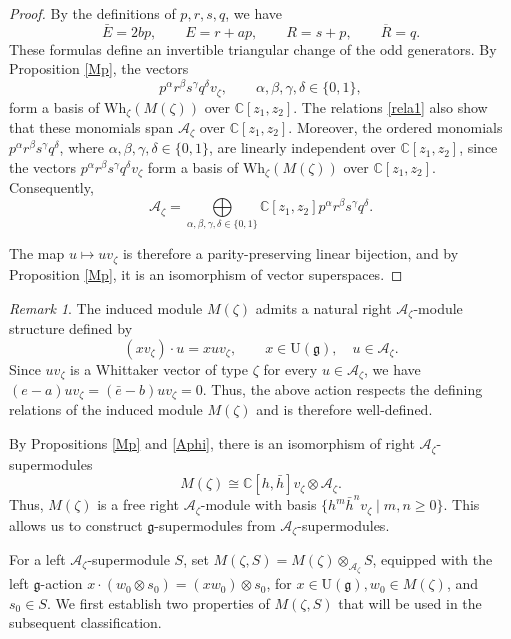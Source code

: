 \documentclass[a4paper,10pt]{article}
\theoremstyle{definition}
\theoremstyle{plain}
\theoremstyle{remark}
\newtheorem{remark}[definition]{Remark}
\theoremstyle{mystyle}
\numberwithin{equation}{section}
\begin{document}
\begin{proof}
    By the definitions of $p,r,s,q$, we have
    $$
    \bar E=2bp,\qquad E=r+ap,\qquad R=s+p,\qquad \overline{R}=q.
    $$
    These formulas define an invertible triangular change of the odd generators. By Proposition \ref{Mp}, the vectors 
    \[
    p^\alpha r^\beta s^\gamma q^\delta v_{\zeta},\qquad \alpha,\beta,\gamma,\delta\in\{0,1\},
    \] 
    form a basis of $\mathrm{Wh}_{\zeta}(M(\zeta))$ over $\mathbb C[z_1,z_2]$. The relations \eqref{rela1} also show that these monomials span \(\mathcal A_\zeta\) over \(\mathbb C[z_1,z_2]\). Moreover, the ordered monomials \(p^\alpha r^\beta s^\gamma q^\delta\), where \(\alpha,\beta,\gamma,\delta\in\{0,1\}\), are linearly independent over \(\mathbb C[z_1,z_2]\), since the vectors \(p^\alpha r^\beta s^\gamma q^\delta v_\zeta\) form a basis of \(\mathrm{Wh}_{\zeta}(M(\zeta))\) over \(\mathbb C[z_1,z_2]\). Consequently, 
    $$
    \mathcal A_{\zeta}=\bigoplus\limits_{\alpha ,\beta ,\gamma,\delta\in \{0,1\}}\mathbb C[z_1,z_2]p^{\alpha}r^{\beta}s^{\gamma}q^{\delta}.
    $$
    
    The map \(u\mapsto uv_{\zeta}\) is therefore a parity-preserving linear bijection, and by Proposition \ref{Mp}, it is an isomorphism of vector superspaces.
\end{proof}
\begin{remark}\label{free}
    The induced module \(M(\zeta)\) admits a natural right \(\mathcal A_\zeta\)-module structure defined by
    \[
    (xv_{\zeta})\cdot u=xuv_{\zeta},\qquad x\in \mathrm U(\mathfrak g),\quad u\in\mathcal A_\zeta.
    \]
    Since \(uv_\zeta\) is a Whittaker vector of type \(\zeta\) for every \(u\in \mathcal A_\zeta\), we have $(e-a)uv_\zeta=(\bar e-b)uv_\zeta=0$. Thus, the above action respects the defining relations of the induced module \(M(\zeta)\) and is therefore well-defined.

    By Propositions \ref{Mp} and \ref{Aphi}, there is an isomorphism of right $\mathcal A_{\zeta}$-supermodules 
    \begin{equation*}
    M(\zeta)\cong \mathbb C[h,\bar h]v_{\zeta}\otimes \mathcal A_{\zeta}.
    \end{equation*}
    Thus, \(M(\zeta)\) is a free right \(\mathcal A_\zeta\)-module with basis $\{h^m\bar h^nv_{\zeta}\mid m,n\geq0\}.$
    This allows us to construct $\mathfrak g$-supermodules from \(\mathcal A_\zeta\)-supermodules.
\end{remark}
    For a left $\mathcal A_{\zeta}$-supermodule $S$, set $M(\zeta,S)=M(\zeta)\otimes _{\mathcal A_{\zeta}}S$, equipped with the left $\mathfrak g$-action $x\cdot (w_0\otimes s_0)=(xw_0)\otimes s_0$, for $x\in \mathrm U(\mathfrak g),w_0\in M(\zeta)$, and $s_0\in S.$ We first establish two properties of $M(\zeta,S)$ that will be used in the subsequent classification.
\end{document}
